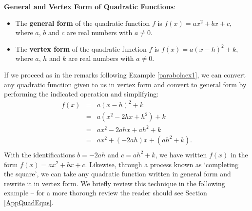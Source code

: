 \documentclass{ximera}
\begin{document}
\medskip


\begin{definition} \label{standardgeneralformofparabolas} \textbf{General and Vertex Form of Quadratic Functions}: 

\begin{itemize}

\item The  \textbf{general form} of the quadratic function $f$ is $f(x) = ax^2+bx+c$, where $a$, $b$ and $c$ are real numbers with $a \neq 0$.

\item The  \textbf{vertex form} of the quadratic function $f$ is $f(x) = a(x-h)^2 + k$, where $a$, $h$ and $k$ are real numbers with $a\neq 0$.

\end{itemize}

\end{definition}


\label{standardtogeneraldiscussion}
If we proceed as in the remarks following Example \ref{parabolaex1}, we can convert any quadratic function given to us in vertex form and convert to general form by performing the indicated operation and simplifying: \[ \begin{array}{rcl}

f(x) &  = & a(x-h)^2 + k  \\
      &= &   a \left(x^2 -2hx + h^2 \right) + k  \\
      & =  & ax^2 - 2ahx + ah^2 + k   \\
      & =  & a x^2 + (-2ah)x + (ah^2+k). \\  \end{array}\] With the identifications $b = -2ah$ and $c = ah^2+k$, we have written $f(x)$ in the form $f(x) = ax^2 + bx+c$.  Likewise, through a process known as   `completing the square', we can take any quadratic function written in general form and rewrite it in vertex form.  We briefly review this technique in the following example -- for a more thorough review the reader should see Section \ref{AppQuadEqus}. 
\end{document}
